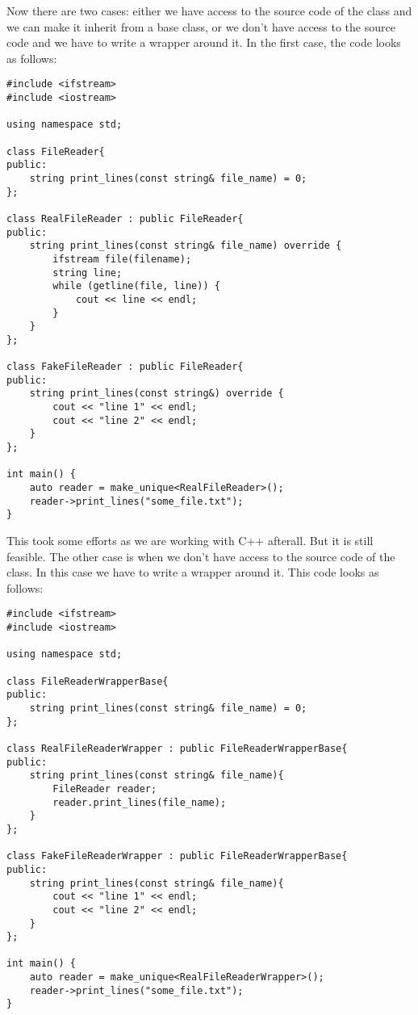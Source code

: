 Now there are two cases: either we have access to the source code of the  class and we can make it inherit from a base class, or we don't have access to the source code and we have to write a wrapper around it. In the first case, the code looks as follows:


\begin{programcode}{}
\begin{verbatim}
#include <ifstream>
#include <iostream>

using namespace std; 

class FileReader{
public:
    string print_lines(const string& file_name) = 0;
};

class RealFileReader : public FileReader{
public:
    string print_lines(const string& file_name) override {
        ifstream file(filename);
        string line;
        while (getline(file, line)) {
            cout << line << endl;
        }
    }
};

class FakeFileReader : public FileReader{
public:
    string print_lines(const string&) override {
        cout << "line 1" << endl;
        cout << "line 2" << endl;
    }
};

int main() {
    auto reader = make_unique<RealFileReader>();
    reader->print_lines("some_file.txt");
}
\end{verbatim}
\end{programcode}

This took some efforts as we are working with C++ afterall. But it is still feasible. The other case is when we don't have access to the source code of the  class. In this case we have to write a wrapper around it. This code looks as follows:

\begin{programcode}{}
\begin{verbatim}
#include <ifstream>
#include <iostream>

using namespace std;

class FileReaderWrapperBase{
public:
    string print_lines(const string& file_name) = 0;
};

class RealFileReaderWrapper : public FileReaderWrapperBase{
public:
    string print_lines(const string& file_name){
        FileReader reader;
        reader.print_lines(file_name);
    }
};

class FakeFileReaderWrapper : public FileReaderWrapperBase{
public:
    string print_lines(const string& file_name){
        cout << "line 1" << endl;
        cout << "line 2" << endl;
    }
};

int main() {
    auto reader = make_unique<RealFileReaderWrapper>();
    reader->print_lines("some_file.txt");
}
\end{verbatim}
\end{programcode}

